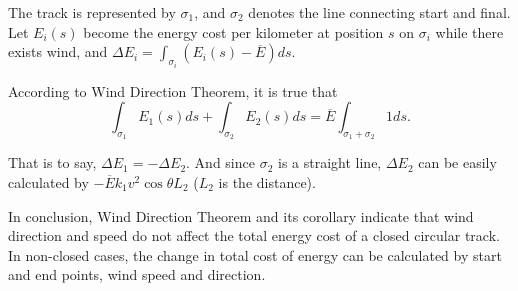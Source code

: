   \par The track is represented by $\sigma_1$, and $\sigma_2$ denotes the line connecting start and final. Let $E_i(s)$ become the energy cost per kilometer at position $s$ on $\sigma_i$ while there exists wind, and $\Delta E_i=\int_{\sigma_i}(E_i(s)-\overline{E})ds$. 
\par According to Wind Direction Theorem, it is true that
\begin{equation}
	\int_{\sigma_1}E_1(s)ds + \int_{\sigma_2}E_2(s)ds = \overline{E} \int_{\sigma_1+\sigma_2}1ds.
\end{equation}
\par That is to say, $\Delta E_1 = -\Delta E_2$. And since $\sigma_2$ is a straight line, $\Delta E_2$ can be easily calculated by $-\overline{E}k_1v^2\cos\theta L_2$ ($L_2$ is the distance).
\par In conclusion, Wind Direction Theorem and its corollary indicate that wind direction and speed do not affect the total energy cost of a closed circular track. In non-closed cases, the change in total cost of energy can be calculated by start and end points, wind speed and direction.
